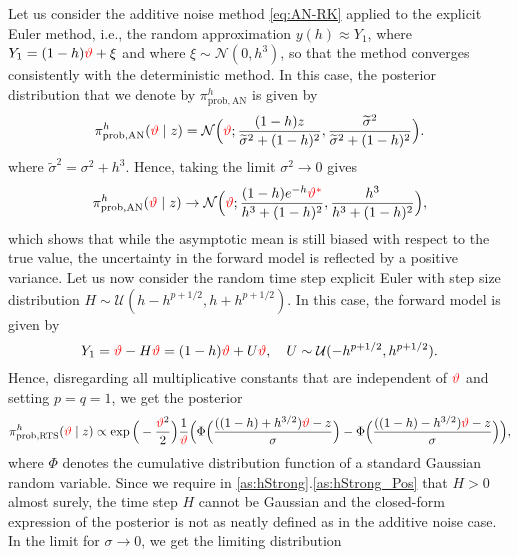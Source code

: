 \documentclass[10pt]{article}
\begin{document}
Let us consider the additive noise method \eqref{eq:AN-RK} applied to the explicit Euler method, i.e., the random approximation $y(h) \approx Y_1$, where $Y_1 = (1 - h){\color{red}\vartheta} + \xi$ and where $\xi \sim \mathcal N(0, h^3)$, so that the method converges consistently with the deterministic method. In this case, the posterior distribution that we denote by $\pi^h_{\mathrm{prob, AN}}$ is given by
\begin{equation}
\pi^h_{\mathrm{prob, AN}}({\color{red}\vartheta} \mid z) = \mathcal N\Big({\color{red}\vartheta}; \frac{(1 - h)z}{\widetilde \sigma^2 + (1- h)^2}, \frac{\widetilde \sigma^2}{\widetilde \sigma^2 + (1 - h)^2}\Big).
\end{equation}
where $\tilde \sigma^2 = \sigma^2 + h^3$. Hence, taking the limit $\sigma^2 \to 0$ gives
\begin{equation}\label{eq:ExPosteriorAN}
\pi^h_{\mathrm{prob, AN}}({\color{red}\vartheta} \mid z) \to \mathcal N\Big({\color{red}\vartheta}; \frac{(1 - h)e^{-h}{\color{red}\vartheta^*}}{h^3 + (1 - h)^2}, \frac{h^3}{h^3 + (1 - h)^2}\Big),
\end{equation}
which shows that while the asymptotic mean is still biased with respect to the true value, the uncertainty in the forward model is reflected by a positive variance.
Let us now consider the random time step explicit Euler with step size distribution $H \sim \mathcal U(h - h^{p+1/2}, h + h^{p+1/2})$. In this case, the forward model is given by
\begin{equation}
Y_1 = {\color{red}\vartheta} - H {\color{red}\vartheta} = (1 - h){\color{red}\vartheta} + U {\color{red}\vartheta}, \quad U \sim \mathcal U (-h^{p+1/2}, h^{p+1/2}).
\end{equation}
Hence, disregarding all multiplicative constants that are independent of ${\color{red}\vartheta}$ and setting $p = q = 1$, we get the posterior
\begin{equation}\label{eq:ExPosteriorRTS}
\pi^h_{\mathrm{prob, RTS}}({\color{red}\vartheta} \mid z) \propto \exp\Big(-\frac{{\color{red}\vartheta}^2}{2}\Big) \frac{1}{{\color{red}\vartheta}} \Big(\Phi\Big(\frac{((1 - h) + h^{3/2}){\color{red}\vartheta} - z}{\sigma}\Big) - \Phi\Big(\frac{((1 - h) - h^{3/2}){\color{red}\vartheta} - z}{\sigma}\Big) \Big),
\end{equation}
where $\Phi$ denotes the cumulative distribution function of a standard Gaussian random variable. Since we require in  \cref{as:hStrong}.\ref{as:hStrong_Pos} that $H > 0$ almost surely, the time step $H$ cannot be Gaussian and the closed-form expression of the posterior is not as neatly defined as in the additive noise case. In the limit for $\sigma \to 0$, we get the limiting distribution 
\end{document}
